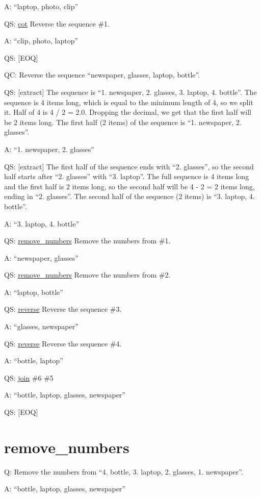 \documentclass[
]{article}
\begin{document}
A: ``laptop, photo, clip''

QS: \hyperref[cot]{cot} Reverse the sequence \#1.

A: ``clip, photo, laptop''

QS: {[}EOQ{]}

QC: Reverse the sequence ``newspaper, glasses, laptop, bottle''.

QS: {[}extract{]} The sequence is ``1. newspaper, 2. glasses, 3. laptop,
4. bottle''. The sequence is 4 items long, which is equal to the minimum
length of 4, so we split it. Half of 4 is 4 / 2 = 2.0. Dropping the
decimal, we get that the first half will be 2 items long. The first half
(2 items) of the sequence is ``1. newspaper, 2. glasses''.

A: ``1. newspaper, 2. glasses''

QS: {[}extract{]} The first half of the sequence ends with ``2.
glasses'', so the second half starts after ``2. glasses'' with ``3.
laptop''. The full sequence is 4 items long and the first half is 2
items long, so the second half will be 4 - 2 = 2 items long, ending in
``2. glasses''. The second half of the sequence (2 items) is ``3.
laptop, 4. bottle''.

A: ``3. laptop, 4. bottle''

QS: \hyperref[remove_numbers]{remove\_numbers} Remove the numbers from
\#1.

A: ``newspaper, glasses''

QS: \hyperref[remove_numbers]{remove\_numbers} Remove the numbers from
\#2.

A: ``laptop, bottle''

QS: \hyperref[reverse]{reverse} Reverse the sequence \#3.

A: ``glasses, newspaper''

QS: \hyperref[reverse]{reverse} Reverse the sequence \#4.

A: ``bottle, laptop''

QS: \hyperref[join]{join} \#6 \#5

A: ``bottle, laptop, glasses, newspaper''

QS: {[}EOQ{]}

\section{remove\_numbers}\label{remove_numbers}

Q: Remove the numbers from ``4. bottle, 3. laptop, 2. glasses, 1.
newspaper''.

A: ``bottle, laptop, glasses, newspaper''
\end{document}
